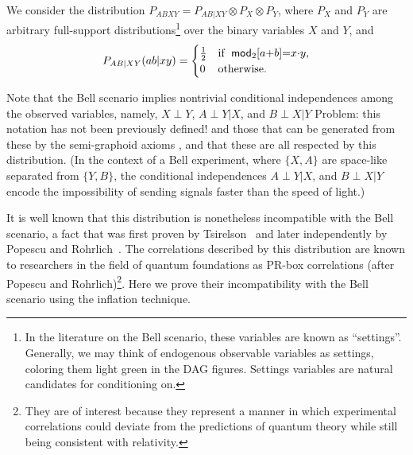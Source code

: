 We consider the distribution ${P_{A B X Y} = P_{A B | X Y} \otimes P_{X} \otimes P_{Y}}$, where $P_{X}$ and $P_{Y}$ are arbitrary full-support distributions\footnote{In the literature on the Bell scenario, these variables are known as ``settings''. Generally, we may think of endogenous observable variables as settings, coloring them light green in the DAG figures. Settings variables are natural candidates for conditioning on.} over the binary variables $X$ and $Y$, and
\begin{align}\begin{split}\label{eq:PRbox}
P_{A B | X Y}\parens{a b |x y}=\begin{cases}\tfrac{1}{2}&\text{if }\; \SmallNamedFunction[2]{mod}{a\cramp{+}b}\eql x\cramp{\cdot} y, \\ 0&\text{otherwise}.\end{cases}
\end{split}\end{align}

Note that the Bell scenario implies nontrivial conditional independences among the observed variables, namely, $X \perp Y$, $A \perp Y| X$, and $B \perp X|Y$ {\color{purple} Problem: this notation has not been previously defined!} and those that can be generated from these by the semi-graphoid axioms \cite{WoodSpekkens}, and that these are all respected by this distribution.
(In the context of a Bell experiment, where $\{X,A\}$ are space-like separated from $\{Y,B\}$, the conditional independences $A \perp Y| X$, and $B \perp X|Y$ encode the impossibility of sending signals faster than the speed of light.)   

It is well known that this distribution is nonetheless incompatible with the Bell scenario, a fact that was first proven by Tsirelson~\cite{Tsirelson1980} and later independently by Popescu and Rohrlich~\cite{PROriginal,PRUnit}.
The correlations described by this distribution are known to researchers in the field of quantum foundations as PR-box correlations (after Popescu and Rohrlich)\footnote{They are of interest because they represent a manner in which experimental correlations could deviate from the predictions of quantum theory while still being consistent with relativity.}.  
Here we prove their incompatibility with the Bell scenario using the inflation technique. 

